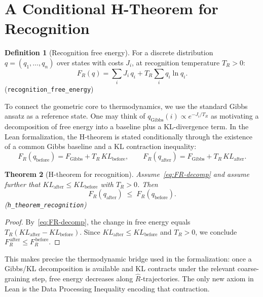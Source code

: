 \documentclass[11pt,a4paper]{article}
\newtheorem{theorem}{Theorem}[section]
\theoremstyle{definition}
\newtheorem{definition}[theorem]{Definition}
\newcommand{\Jc}{J}
\newcommand{\Rhat}{\hat{R}}
\newcommand{\FR}{F_{\!R}}
\newcommand{\TR}{T_{\!R}}
\newcommand{\code}[1]{\texttt{\small #1}}
\begin{document}
\section{A Conditional H-Theorem for Recognition}
\label{sec:htheorem}

\begin{definition}[Recognition free energy]
For a discrete distribution $q = (q_1,\ldots,q_n)$ over states with
costs $\Jc_i$, at recognition temperature $\TR > 0$:
\begin{equation}\label{eq:FR}
  \FR(q) = \sum_i \Jc_i \, q_i + \TR \sum_i q_i \ln q_i.
\end{equation}
\textup{(\code{recognition\_free\_energy})}
\end{definition}

To connect the geometric core to thermodynamics, we use the standard Gibbs
ansatz as a reference state.  One may think of
$q_{\mathrm{Gibbs}}(i) \propto e^{-\Jc_i/\TR}$ as motivating a decomposition of
free energy into a baseline plus a KL-divergence term.  In the Lean
formalization, the H-theorem is stated conditionally through the existence of a
common Gibbs baseline and a KL contraction inequality:
\begin{equation}\label{eq:FR-decomp}
  \FR(q_{\mathrm{before}}) = F_{\mathrm{Gibbs}} + \TR \, KL_{\mathrm{before}},
  \qquad
  \FR(q_{\mathrm{after}}) = F_{\mathrm{Gibbs}} + \TR \, KL_{\mathrm{after}}.
\end{equation}

\begin{theorem}[H-theorem for recognition]\label{thm:htheorem}
Assume~\eqref{eq:FR-decomp} and assume further that
$KL_{\mathrm{after}} \le KL_{\mathrm{before}}$ with $\TR > 0$.  Then
\[
  \FR(q_{\mathrm{after}}) \;\le\; \FR(q_{\mathrm{before}}).
\]
\textup{(\code{h\_theorem\_recognition})}
\end{theorem}

\begin{proof}
By~\eqref{eq:FR-decomp}, the change in free energy equals
$\TR(KL_{\mathrm{after}} - KL_{\mathrm{before}})$.  Since
$KL_{\mathrm{after}} \le KL_{\mathrm{before}}$ and $\TR > 0$, we conclude
$\FR^{\,\mathrm{after}} \le \FR^{\,\mathrm{before}}$.
\end{proof}

This makes precise the thermodynamic bridge used in the formalization: once a
Gibbs/KL decomposition is available and KL contracts under the relevant
coarse-graining step, free energy decreases along $\Rhat$-trajectories.  The
only new axiom in Lean is the Data Processing Inequality encoding that
contraction.
\end{document}
